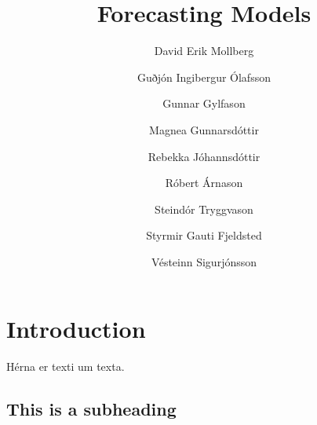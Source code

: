 \documentclass[10pt]{article}
\title{Forecasting Models}
\author{David Erik Mollberg \and Guðjón Ingibergur Ólafsson \and Gunnar Gylfason \and Magnea Gunnarsdóttir \and Rebekka Jóhannsdóttir \and Róbert Árnason \and Steindór Tryggvason \and Styrmir Gauti Fjeldsted \and Vésteinn Sigurjónsson}
\begin{document}
\maketitle

\section{Introduction}
Hérna er texti um texta. 

\subsection{This is a subheading}


%



%




%
%
\end{document}
